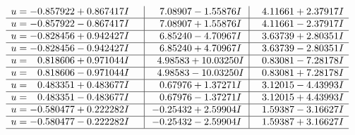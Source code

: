 \documentclass[1p]{elsarticle_modified}
\theoremstyle{definition}
\begin{document}
$$\begin{array}{c|c|c}
\begin{aligned}
u &= -0.857922 + 0.867417 I\end{aligned}
 & \phantom{-}7.08907 - 1.55876 I & \phantom{-}4.11661 + 2.37917 I \\ \hline\begin{aligned}
u &= -0.857922 - 0.867417 I\end{aligned}
 & \phantom{-}7.08907 + 1.55876 I & \phantom{-}4.11661 - 2.37917 I \\ \hline\begin{aligned}
u &= -0.828456 + 0.942427 I\end{aligned}
 & \phantom{-}6.85240 - 4.70967 I & \phantom{-}3.63739 + 2.80351 I \\ \hline\begin{aligned}
u &= -0.828456 - 0.942427 I\end{aligned}
 & \phantom{-}6.85240 + 4.70967 I & \phantom{-}3.63739 - 2.80351 I \\ \hline\begin{aligned}
u &= \phantom{-}0.818606 + 0.971044 I\end{aligned}
 & \phantom{-}4.98583 + 10.03250 I & \phantom{-}0.83081 - 7.28178 I \\ \hline\begin{aligned}
u &= \phantom{-}0.818606 - 0.971044 I\end{aligned}
 & \phantom{-}4.98583 - 10.03250 I & \phantom{-}0.83081 + 7.28178 I \\ \hline\begin{aligned}
u &= \phantom{-}0.483351 + 0.483677 I\end{aligned}
 & \phantom{-}0.67976 + 1.37271 I & \phantom{-}3.12015 - 4.43993 I \\ \hline\begin{aligned}
u &= \phantom{-}0.483351 - 0.483677 I\end{aligned}
 & \phantom{-}0.67976 - 1.37271 I & \phantom{-}3.12015 + 4.43993 I \\ \hline\begin{aligned}
u &= -0.580477 + 0.222282 I\end{aligned}
 & -0.25432 + 2.59904 I & \phantom{-}1.59387 - 3.16627 I \\ \hline\begin{aligned}
u &= -0.580477 - 0.222282 I\end{aligned}
 & -0.25432 - 2.59904 I & \phantom{-}1.59387 + 3.16627 I\\
 \hline 
 \end{array}$$\newpage
\newpage\renewcommand{\arraystretch}{1}
\end{document}
